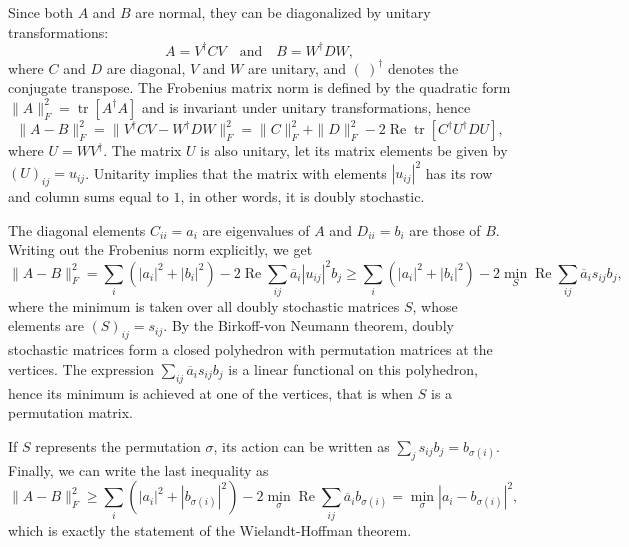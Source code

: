 \documentclass[12pt]{article}
\def\tr{\operatorname{tr}}
\def\Re{\operatorname{Re}}
\begin{document}
Since both $A$ and $B$ are normal, they can be diagonalized by unitary transformations:
\[
  A = V^\dagger C V \quad \text{and} \quad B = W^\dagger D W,
\]
where $C$ and $D$ are diagonal, $V$ and $W$ are unitary, and $(~)^\dagger$
denotes the conjugate transpose. The Frobenius matrix norm is defined by the quadratic form $\|A\|_F^2 = \tr[A^\dagger A]$ and is invariant
under unitary transformations, hence
\[
  \|A-B\|_F^2 = \|V^\dagger C V - W^\dagger D W\|_F^2
    = \|C\|_F^2 + \|D\|_F^2
      - 2\Re\tr[C^\dagger U^\dagger D U],
\]
where $U=W V^\dagger$. The matrix $U$ is also unitary, let its matrix elements
be given by $(U)_{ij} = u_{ij}$. Unitarity implies that the matrix with
elements $|u_{ij}|^2$ has its row and column sums equal to $1$, in other words,
it is doubly stochastic.

The diagonal elements $C_{ii} = a_i$ are eigenvalues of $A$ and
$D_{ii} = b_i$ are those of $B$. Writing out the Frobenius norm explicitly,
we get
\[
  \|A-B\|_F^2 = \sum_{i} (|a_i|^2+|b_i|^2)
    - 2\Re\sum_{ij} \overline{a}_i |u_{ij}|^2 b_j
    \ge \sum_{i} (|a_i|^2+|b_i|^2)
      - 2\min_{S} \Re \sum_{ij} \overline{a}_i s_{ij} b_j,
\]
where the minimum is taken over all doubly stochastic matrices $S$, whose
elements are $(S)_{ij} = s_{ij}$. By the Birkoff-von Neumann theorem, doubly
stochastic matrices form a closed  polyhedron
with permutation matrices at the vertices. The expression
$\sum_{ij} \overline{a}_i s_{ij} b_j$ is a linear functional on this polyhedron,
hence its minimum is achieved at one of the vertices, that is when $S$
is a permutation matrix.

If $S$ represents the permutation $\sigma$, its action can be written as
$\sum_{j} s_{ij} b_j = b_{\sigma(i)}$. Finally, we can write the last
inequality as
\[
  \|A-B\|_F^2 \ge \sum_{i} (|a_i|^2+|b_{\sigma(i)}|^2)
    - 2\min_{\sigma} \Re\sum_{ij} \overline{a}_i b_{\sigma(i)}
    = \min_{\sigma} |a_i-b_{\sigma(i)}|^2,
\]
which is exactly the statement of the Wielandt-Hoffman theorem.
\end{document}
